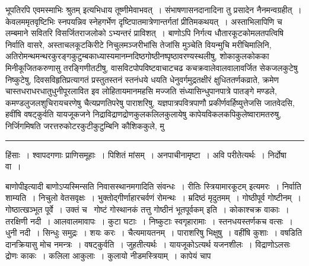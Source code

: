 \documentclass[11pt, openany]{book}
\begin{document}
भूपतिरपि {\haq एवमस्माभिः श्रुतम्} इत्यभिधाय तूष्णीमेवाभवत्~। संभाषणासनदानादिना तु प्रसादेन नैनमन्वग्रहीत्~। केवलममृतवृष्टिभिः स्नपयन्निव स्नेहगर्भेण दृष्टिपातमात्रेणान्तर्गतां प्रीतिमकथयत्~। अस्ताभिलापिणि च लम्बमाने सवितरि विसर्जितराजलोको ऽभ्यन्तरं प्राविशत्~। बाणोऽपि निर्गत्य धौतारकूटकोमलतपत्विषि निर्वाति वासरे, अस्ताचलकूटकिरीटे निचुलमञ्जरीभांसि तेजांसि मुञ्चेति वियन्मुचि मरीचिमालिनि, अतिरोमन्थमन्थरकुरङ्गकुटुम्बकाध्यास्यमानम्नदिष्ठगोष्ठीनष्पृष्ठावरण्यस्थलीषु, शोकाकुलकोकका मिनीकूजितकरुणासु तरङ्गिणीतटीषु, वासविटपोपविष्टवाचाटचढ कचक्रवालेवालवालावर्जित सेकजलकुटेषु निष्कुटेषु, दिवसविहृतिप्रत्यागतं प्रस्तुतस्तनं स्तनंधये धयति धेनुवर्गमुद्रतक्षीरं क्षुधिततर्णकव्राते, क्रमेण चास्तधराधरधातुधुनीपूरलावित इव लोहितायमानमहसि मज्जति संध्यासिन्धुपानपात्रे पातङ्गे मण्डले, कमण्डलुजलशुचिरायचरणेषु चैत्यप्रणतिपरेषु पाराशरिषु, यज्ञपात्रपवित्रपाणौ प्रकीर्णवर्हिष्युत्तेजसि जातवेदसि, हवींषि वषट्कुर्वति यायजूकजने निद्राविद्राणद्रोणकुलकलिलकुलायेषु कापेयविकलकपिकुलेष्वारामतरुषु, निर्जिगमिषति जरत्तरुकोटरकुटीकुटुम्बिनि कौशिककुले, मु\textendash

\vspace{2mm}
\hrule

\noindent
{\s हिंसाः~। श्वापदगणाः प्राणिसमूहाः~। पिशितं मांसम्~। अनपाचीनामृष्टा~। अवि परीतेत्यर्थः~। निर्दोषा वा~।

बाणोपीइत्यादी बाणोऽप्यस्मिन्सति निवासस्थानमगादिति संवन्धः~। {\qt रीतिः स्त्रियामारकूटम्} इत्यमरः~। निर्वाति शाम्यति~। निचुलो वेतसवृक्षः~। भुक्तोद्गीर्णाहारचर्वणं रोमन्थः~। म्रदिष्ठं मृदुतमम्~। गोष्ठीपूर्व गोष्टीनम्~। {\qt गोष्ठात्खञ्भूत पूर्वे}~। उक्तं च \textendash\ गोष्टं गोस्थानकं तत्तु गोष्ठीनं भूतपूर्वकम् इति~। कोकाश्चक्र वाकाः~। तरक्षिणी नदी~। आलवालमावापः~। कुटा घटाः~। निष्कुटाः स्वगृहारामाः~। स्तनधयस्तर्णकच वत्सः~। धुनी नदी~। सिन्धुः समुद्रः~। शयः करः~। चैत्यमायतनम्~। पाराशरिषु भिक्षुषु~। वहींषि कुशाः~। वषडिति दानक्रियासु मोच नमन्त्रः~। वषट्कुर्वति~। जुहतीत्यर्थः~। यायजूकोऽत्यर्थ यजनशीलः~। विद्राणोऽलसः द्रोणः काकः~। कलिला आकुलाः~। कुलायो नीडमस्त्रियाम्~। कापेयं चाप\textendash}

\newpage
\end{document}
